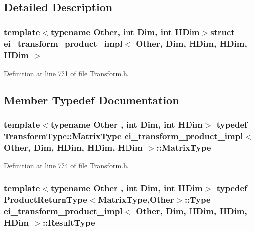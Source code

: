 \subsection{Detailed Description}
\subsubsection*{template$<$typename Other, int Dim, int H\-Dim$>$struct ei\-\_\-transform\-\_\-product\-\_\-impl$<$ Other, Dim, H\-Dim, H\-Dim, H\-Dim $>$}



Definition at line 731 of file Transform.\-h.



\subsection{Member Typedef Documentation}
\hypertarget{structei__transform__product__impl_3_01_other_00_01_dim_00_01_h_dim_00_01_h_dim_00_01_h_dim_01_4_a1cf099be5f79f67173f84cde8196fe2c}{
\subsubsection[{Matrix\-Type}]{\setlength{\rightskip}{0pt plus 5cm}template$<$typename Other , int Dim, int H\-Dim$>$ typedef {\bf Transform\-Type\-::\-Matrix\-Type} {\bf ei\-\_\-transform\-\_\-product\-\_\-impl}$<$ Other, Dim, H\-Dim, H\-Dim, H\-Dim $>$\-::{\bf Matrix\-Type}}}\label{structei__transform__product__impl_3_01_other_00_01_dim_00_01_h_dim_00_01_h_dim_00_01_h_dim_01_4_a1cf099be5f79f67173f84cde8196fe2c}


Definition at line 734 of file Transform.\-h.

\hypertarget{structei__transform__product__impl_3_01_other_00_01_dim_00_01_h_dim_00_01_h_dim_00_01_h_dim_01_4_a28fef3d5380ae5a3b93ad83eef1e0f61}{
\subsubsection[{Result\-Type}]{\setlength{\rightskip}{0pt plus 5cm}template$<$typename Other , int Dim, int H\-Dim$>$ typedef {\bf Product\-Return\-Type}$<${\bf Matrix\-Type},Other$>$\-::Type {\bf ei\-\_\-transform\-\_\-product\-\_\-impl}$<$ Other, Dim, H\-Dim, H\-Dim, H\-Dim $>$\-::{\bf Result\-Type}}}\label{structei__transform__product__impl_3_01_other_00_01_dim_00_01_h_dim_00_01_h_dim_00_01_h_dim_01_4_a28fef3d5380ae5a3b93ad83eef1e0f61}


